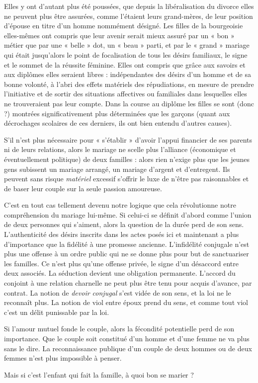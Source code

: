  Elles y ont d'autant plus été poussées, que depuis la libéralisation du divorce elles ne peuvent plus être assurées, comme l'étaient leurs grand-mères, de leur position d'épouse en titre d'un homme nommément désigné. Les filles de la bourgeoisie elles-mêmes ont compris que leur avenir serait mieux assuré par un « bon » métier que par une « belle » dot, un « beau » parti, et par le « grand » mariage qui était jusqu'alors le point de focalisation de tous les désirs familiaux, le signe et le sommet de la réussite féminine. Elles ont compris que grâce aux savoirs et aux diplômes elles seraient libres : indépendantes des désirs d'un homme et de sa bonne volonté, à l'abri des effets matériels des répudiations, en mesure de prendre l'initiative et de sortir des situations affectives ou familiales dans lesquelles elles ne trouveraient pas leur compte. Dans la course au diplôme les filles se sont (donc ?) montrées significativement plus déterminées que les garçons (quant aux décrochages scolaires de ces derniers, ils ont bien entendu d'autres causes). 

 S'il n'est plus nécessaire pour « s'établir » d'avoir l'appui financier de ses parents ni de leurs relations, alors le mariage ne scelle plus l'alliance (économique et éventuellement politique) de deux familles : alors rien n'exige plus que les jeunes gens subissent un mariage arrangé, un mariage d'argent et d'entregent. Ils peuvent sans risque \emph{matériel} excessif s'offrir le luxe de n'être pas raisonnables et de baser leur couple sur la seule passion amoureuse.

 C'est en tout cas tellement devenu notre logique que cela révolutionne notre compréhension du mariage lui-même. Si celui-ci se définit d'abord comme l'union de deux personnes qui s'aiment, alors la question de la durée perd de son sens. L'authenticité des désirs inscrits dans les actes posés ici et maintenant a plus d'importance que la fidélité à une promesse ancienne. L'infidélité conjugale n'est plus une offense à un ordre public qui ne se donne plus pour but de sanctuariser les familles. Ce n'est plus qu'une offense privée, le signe d'un désaccord entre deux associés. La séduction devient une obligation permanente. L'accord du conjoint à une relation charnelle ne peut plus être tenu pour acquis d'avance, par contrat. La notion de \emph{devoir conjugal} s'est vidée de son sens, et la loi ne le reconnaît plus. La notion de viol entre époux prend du sens, et comme tout viol c'est un délit punissable par la loi. 

 Si l'amour mutuel fonde le couple, alors la fécondité potentielle perd de son importance. Que le couple soit constitué d'un homme et d'une femme ne va plus sans le dire. La reconnaissance publique d'un couple de deux hommes ou de deux femmes n'est plus impossible à penser. 

 Mais si c'est l'enfant qui fait la famille, à quoi bon se marier ?
